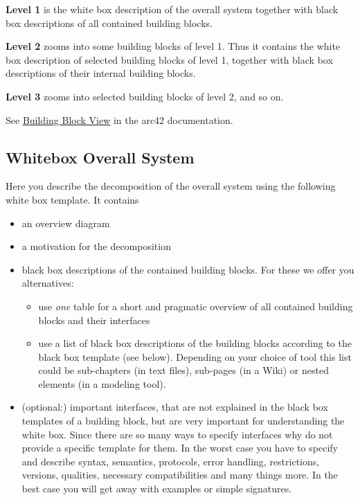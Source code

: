 \documentclass[
]{article}
\begin{document}
\textbf{Level 1} is the white box description of the overall system
together with black box descriptions of all contained building blocks.

\textbf{Level 2} zooms into some building blocks of level 1. Thus it
contains the white box description of selected building blocks of level
1, together with black box descriptions of their internal building
blocks.

\textbf{Level 3} zooms into selected building blocks of level 2, and so
on.

See \href{https://docs.arc42.org/section-5/}{Building Block View} in the
arc42 documentation.

\hypertarget{_whitebox_overall_system}{%
\subsection{Whitebox Overall System}\label{_whitebox_overall_system}}

Here you describe the decomposition of the overall system using the
following white box template. It contains

\begin{itemize}
\item
  an overview diagram
\item
  a motivation for the decomposition
\item
  black box descriptions of the contained building blocks. For these we
  offer you alternatives:

  \begin{itemize}
  \item
    use \emph{one} table for a short and pragmatic overview of all
    contained building blocks and their interfaces
  \item
    use a list of black box descriptions of the building blocks
    according to the black box template (see below). Depending on your
    choice of tool this list could be sub-chapters (in text files),
    sub-pages (in a Wiki) or nested elements (in a modeling tool).
  \end{itemize}
\item
  (optional:) important interfaces, that are not explained in the black
  box templates of a building block, but are very important for
  understanding the white box. Since there are so many ways to specify
  interfaces why do not provide a specific template for them. In the
  worst case you have to specify and describe syntax, semantics,
  protocols, error handling, restrictions, versions, qualities,
  necessary compatibilities and many things more. In the best case you
  will get away with examples or simple signatures.
\end{itemize}
\end{document}
